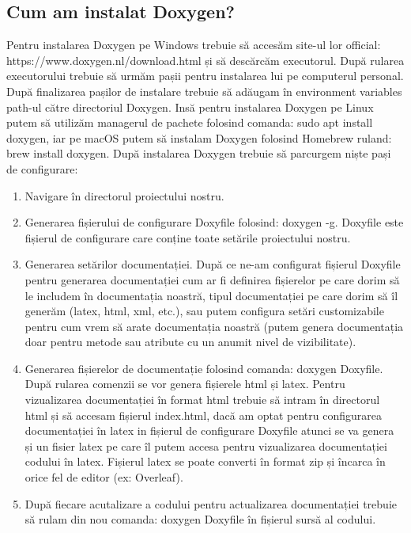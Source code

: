 \documentclass[runningheads]{llncs}
\begin{document}
\subsection{Cum am instalat Doxygen?}
Pentru instalarea Doxygen pe Windows trebuie să accesăm site-ul lor official: https://www.doxygen.nl/download.html și să descărcăm executorul. După rularea executorului trebuie să urmăm pașii pentru instalarea lui pe computerul personal. După finalizarea pașilor de instalare trebuie să adăugam în environment variables path-ul către directoriul Doxygen. Insă pentru instalarea Doxygen pe Linux putem să utilizăm managerul de pachete folosind comanda: sudo apt install doxygen, iar pe macOS putem să instalam Doxygen folosind Homebrew ruland: brew install doxygen.
După instalarea Doxygen trebuie să parcurgem niște pași de configurare:
\begin{enumerate}
    \item Navigare în directorul proiectului nostru.
    \item Generarea fișierului de configurare Doxyfile folosind: doxygen -g. Doxyfile este fișierul de configurare care conține toate setările proiectului nostru.
    \item Generarea setărilor documentației. După ce ne-am configurat fișierul Doxyfile pentru generarea documentației cum ar fi definirea fișierelor pe care dorim să le includem în documentația noastră, tipul documentației pe care dorim să îl generăm (latex, html, xml, etc.), sau putem configura setări customizabile pentru cum vrem să arate documentația noastră (putem genera documentația doar pentru metode sau atribute cu un anumit nivel de vizibilitate). 
    \item Generarea fișierelor de documentație folosind comanda: doxygen Doxyfile. După rularea comenzii se vor genera fișierele html și latex. Pentru vizualizarea documentației în format html trebuie să intram în directorul html și să accesam fișierul index.html, dacă am optat pentru configurarea documentației în latex in fișierul de configurare Doxyfile atunci se va genera și un fisier latex pe care îl putem accesa pentru vizualizarea documentației codului în latex. Fișierul latex se poate converti în format zip și încarca în orice fel de editor (ex: Overleaf).
    \item După fiecare acutalizare a codului pentru actualizarea documentației trebuie să rulam din nou comanda: doxygen Doxyfile în fișierul sursă al codului.
\end{enumerate}
\end{document}
